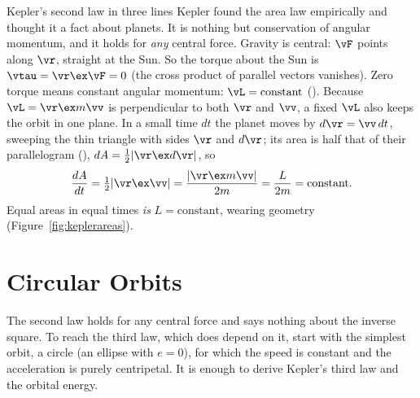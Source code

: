 \begin{derivbox}{Kepler's second law in three lines}
Kepler found the area law empirically and thought it a fact about planets. It is nothing but conservation
of angular momentum, and it holds for \emph{any} central force.
 Gravity is central: $\vF$ points along $\vr$, straight at the Sun. So the torque about the Sun
is $\vtau=\vr\ex\vF=0$ (the cross product of parallel vectors vanishes).
 Zero torque means constant angular momentum: $\vL=\text{constant}$ ().
Because $\vL=\vr\ex m\vv$ is perpendicular to both $\vr$ and $\vv$, a fixed $\vL$ also keeps the orbit
in one plane.
 In a small time $dt$ the planet moves by $d\vr=\vv\,dt$, sweeping the thin triangle with sides $\vr$
and $d\vr$; its area is half that of their parallelogram (), $dA=\tfrac12|\vr\ex d\vr|$, so
\[
\frac{dA}{dt}=\tfrac12|\vr\ex\vv|=\frac{|\vr\ex m\vv|}{2m}=\frac{L}{2m}=\text{constant}.
\]
Equal areas in equal times \emph{is} $L=\text{constant}$, wearing geometry (Figure~\ref{fig:keplerareas}).
\end{derivbox}

\begin{figure}[htbp]
\centering
{}
\end{figure}

\section{Circular Orbits}

The second law holds for any central force and says nothing about the inverse square. To reach the
third law, which does depend on it, start with the simplest orbit, a circle (an ellipse with $e=0$),
for which the speed is constant and the acceleration is purely centripetal. It is enough to derive
Kepler's third law and the orbital energy.

